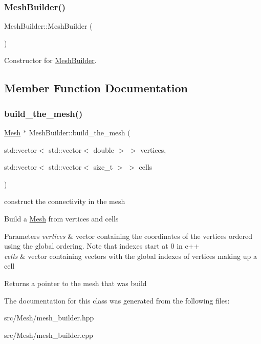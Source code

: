 \subsubsection{\texorpdfstring{Mesh\+Builder()}{MeshBuilder()}}
{\footnotesize\ttfamily Mesh\+Builder\+::\+Mesh\+Builder (\begin{DoxyParamCaption}{ }\end{DoxyParamCaption})}

Constructor for \hyperlink{classHArDCore2D_1_1MeshBuilder}{Mesh\+Builder}. 

\subsection{Member Function Documentation}
\mbox{\label{classHArDCore2D_1_1MeshBuilder_a1c392d732ae962e5355786ff04d19024}} 
\subsubsection{\texorpdfstring{build\+\_\+the\+\_\+mesh()}{build\_the\_mesh()}}
{\footnotesize\ttfamily \hyperlink{classHArDCore2D_1_1Mesh}{Mesh} $\ast$ Mesh\+Builder\+::build\+\_\+the\+\_\+mesh (\begin{DoxyParamCaption}\item[{std\+::vector$<$ std\+::vector$<$ double $>$ $>$}]{vertices,  }\item[{std\+::vector$<$ std\+::vector$<$ size\+\_\+t $>$ $>$}]{cells }\end{DoxyParamCaption})}



construct the connectivity in the mesh 

Build a \hyperlink{classHArDCore2D_1_1Mesh}{Mesh} from vertices and cells


\begin{DoxyParams}{Parameters}
{\em vertices} & vector containing the coordinates of the vertices ordered using the global ordering. Note that indexes start at 0 in c++ \\
\hline
{\em cells} & vector containing vectors with the global indexes of vertices making up a cell\\
\hline
\end{DoxyParams}
\begin{DoxyReturn}{Returns}
a pointer to the mesh that was build 
\end{DoxyReturn}


The documentation for this class was generated from the following files\+:\begin{DoxyCompactItemize}
\item 
src/\+Mesh/mesh\+\_\+builder.\+hpp\item 
src/\+Mesh/mesh\+\_\+builder.\+cpp\end{DoxyCompactItemize}
